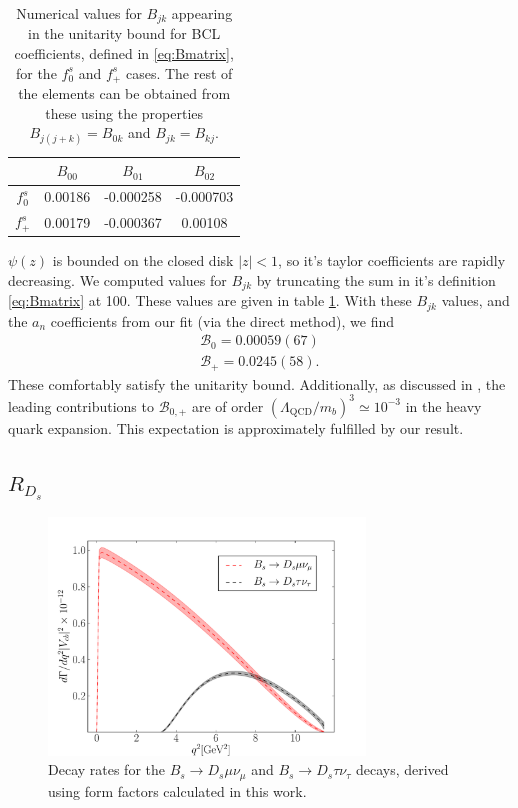 \begin{table}[htb!]
  \begin{center}
    \begin{tabular}{c c c c}
      \hline
      & $B_{00}$ & $B_{01}$ & $B_{02}$ \\ [0.5ex]
      \hline
      $f^s_0$ & 0.00186 & -0.000258 & -0.000703 \\ [0.5ex]
      $f^s_+$ & 0.00179 & -0.000367 & 0.00108 \\ [0.5ex]
      \hline
    \end{tabular}
  \end{center}
  \caption{Numerical values for $B_{jk}$ appearing in the unitarity bound for BCL coefficients, defined in \eqref{eq:Bmatrix}, for the $f^s_0$ and $f^s_+$ cases. The rest of the elements can be obtained from these using the properties $B_{j(j+k)}=B_{0k}$ and $B_{jk}=B_{kj}$. \label{tab:Bmatrix}}
\end{table}

$\psi(z)$ is bounded on the closed disk $|z|<1$, so it's taylor coefficients are rapidly decreasing. We computed values for $B_{jk}$ by truncating the sum in it's definition \eqref{eq:Bmatrix} at 100. These values are given in table \ref{tab:Bmatrix}. With these $B_{jk}$ values, and the $a_n$ coefficients from our fit (via the direct method), we find
\begin{align}
  \nonumber
  \mathcal{B}_0 = 0.00059(67)
  \\ \mathcal{B}_+ = 0.0245(58).
  \nonumber
\end{align}
These comfortably satisfy the unitarity bound. Additionally, as discussed in \cite{BECHER200661}, the leading contributions to $\mathcal{B}_{0,+}$ are of order $(\Lambda_{\text{QCD}}/m_b)^3 \simeq 10^{-3}$ in the heavy quark expansion. This expectation is approximately fulfilled by our result.

\subsection{$R_{D_s}$}

\begin{figure}[htb!]
  \begin{center}
  \includegraphics[width=0.75\textwidth]{images/BsDs/direct/branchingfraction.pdf}
  \caption{Decay rates for the $B_s\to D_s\mu\nu_{\mu}$ and $B_s\to D_s\tau\nu_{\tau}$ decays, derived using form factors calculated in this work.}
  \end{center}
\end{figure}

